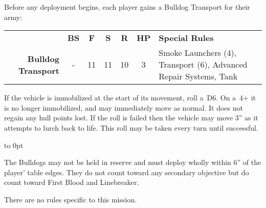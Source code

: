 

\begin{tablesetup}

  \dawnofwar

  \smallskip%
  Before any deployment begins, each player gains a Bulldog Transport
  for their army:

  \begin{center}    
  \begin{tabular}[t]{rcccccL{3in}}
    & {\bf BS} &  {\bf F} & {\bf S} & {\bf R} & {\bf HP} & {\bf Special Rules}\\
    {\bf Bulldog Transport} & - & 11 & 11 & 10 & 3 & Smoke Launchers (4), Transport (6), Advanced Repair Systems, Tank\\
  \end{tabular}
  \end{center}

  \hfill
  \begin{minipage}{6in}
     If the vehicle is
    immobilized at the start of its movement, roll a~D6.  On a~4+ it
    is no longer immobilized, and may immediately move as normal.  It
    does not regain any hull points lost.  If the roll is failed then
    the vehicle may move 3'' as it attempts to lurch back to life.
    This roll may be taken every turn until successful.
  \end{minipage}
  \hfill\hbox to 0pt{}

  \bigskip The Bulldogs may not be held in reserve and must deploy
  wholly within 6'' of the player' table edges.  They do not count
  toward any secondary objective but do count toward First Blood and
  Linebreaker.
\end{tablesetup}

\begin{missionrules}

\bigskip
There are no rules specific to this mission.

\end{missionrules}


